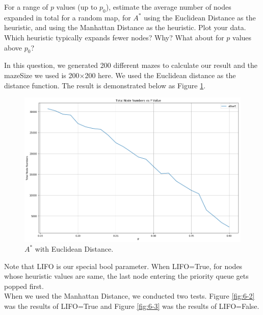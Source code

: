 \documentclass[letter]{article}
\begin{document}
\begin{questions}
	
	\item {For a range of $ p $ values (up to $ p_0 $), estimate the average number of nodes expanded in total for a random map, for $ A^* $ using the Euclidean Distance as the heuristic, and using the Manhattan Distance as the heuristic. Plot your data. Which heuristic typically expands fewer nodes? Why? What about for $ p $ values above $ p_0 $?}
	
	In this question, we generated 200 different mazes to calculate our result and the mazeSize we used is 200×200 here. We used the Euclidean distance as the distance function. The result is demonstrated below as Figure \ref{fig:6-1}. \\
	
	\begin{figure}
		\centering
		\includegraphics[width=\textwidth]{../pics/question6-1.png}
		\caption{\label{fig:6-1} $ A^* $ with Euclidean Distance.}
	\end{figure}
	
	Note that LIFO is our special bool parameter. When LIFO=True, for nodes whose heuristic values are same, the last node entering the priority queue gets popped first. \\
	
	When we used the Manhattan Distance, we conducted two tests. Figure \ref{fig:6-2} was the results of LIFO=True and Figure \ref{fig:6-3} was the results of LIFO=False. \\
	

\end{questions}
\end{document}
